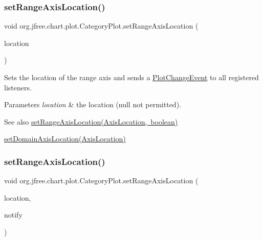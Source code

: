 \subsubsection{\texorpdfstring{set\+Range\+Axis\+Location()}{setRangeAxisLocation()}\hspace{0.1cm}{\footnotesize\ttfamily [1/4]}}
{\footnotesize\ttfamily void org.\+jfree.\+chart.\+plot.\+Category\+Plot.\+set\+Range\+Axis\+Location (\begin{DoxyParamCaption}\item[{\mbox{\hyperlink{classorg_1_1jfree_1_1chart_1_1axis_1_1_axis_location}{Axis\+Location}}}]{location }\end{DoxyParamCaption})}

Sets the location of the range axis and sends a \mbox{\hyperlink{}{Plot\+Change\+Event}} to all registered listeners.


\begin{DoxyParams}{Parameters}
{\em location} & the location ({\ttfamily null} not permitted).\\
\hline
\end{DoxyParams}
\begin{DoxySeeAlso}{See also}
\mbox{\hyperlink{classorg_1_1jfree_1_1chart_1_1plot_1_1_category_plot_a67286c879b5155d03b131b20336a7307}{set\+Range\+Axis\+Location(\+Axis\+Location, boolean)}} 

\mbox{\hyperlink{classorg_1_1jfree_1_1chart_1_1plot_1_1_category_plot_ac7f82688a2b7a817809144fa9c0d9377}{set\+Domain\+Axis\+Location(\+Axis\+Location)}} 
\end{DoxySeeAlso}
\mbox{\label{classorg_1_1jfree_1_1chart_1_1plot_1_1_category_plot_a67286c879b5155d03b131b20336a7307}} 
\subsubsection{\texorpdfstring{set\+Range\+Axis\+Location()}{setRangeAxisLocation()}\hspace{0.1cm}{\footnotesize\ttfamily [2/4]}}
{\footnotesize\ttfamily void org.\+jfree.\+chart.\+plot.\+Category\+Plot.\+set\+Range\+Axis\+Location (\begin{DoxyParamCaption}\item[{\mbox{\hyperlink{classorg_1_1jfree_1_1chart_1_1axis_1_1_axis_location}{Axis\+Location}}}]{location,  }\item[{boolean}]{notify }\end{DoxyParamCaption})}

